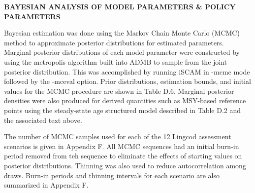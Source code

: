 \documentclass[11pt]{article}   %
\def\AppLet{D}                   %
\begin{document}
\vspace{2ex}
{ \bf BAYESIAN ANALYSIS OF MODEL PARAMETERS \& POLICY PARAMETERS}

Bayesian estimation was done using the Markov Chain Monte Carlo (MCMC) method to approximate posterior distributions for estimated parameters.  Marginal posterior distributions of each model parameter were constructed by using the metropolis algorithm built into ADMB to sample from the joint posterior distribution.  This was accomplished by running iSCAM in -mcmc mode followed by the -mceval option.  Prior distributions, estimation bounds, and initial values for the MCMC procedure are shown in Table \AppLet.6.  Marginal posterior densities were also produced for derived quantities such as MSY-based reference points using the steady-state age structured model described in Table \AppLet.2 and the associated text above.      

The number of MCMC samples used for each of the 12 Lingcod assessment scenarios is given in Appendix F.  All MCMC sequences had an initial burn-in period removed from teh sequence to eliminate the effects of starting values on posterior distributions.  Thinning was also used to reduce autocorrelation among draws.  Burn-in periods and thinning intervals for each scenario are also summarized in Appendix F.
\end{document}
